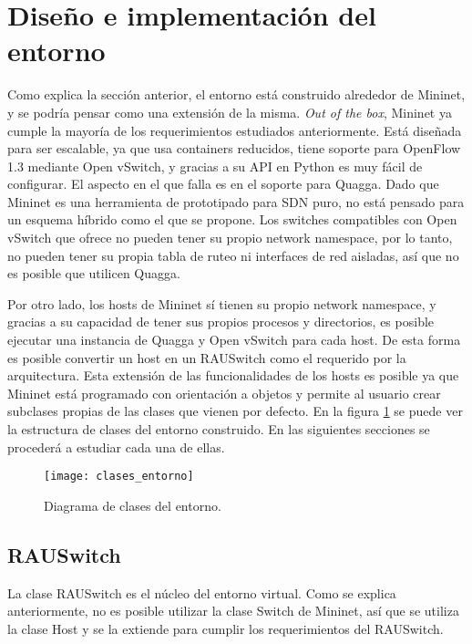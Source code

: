 \section{Diseño e implementación del entorno}
Como explica la sección anterior, el entorno está construido alrededor de Mininet, y se podría pensar como una extensión de la misma. \textit{Out of the box}, Mininet ya cumple la mayoría de los requerimientos estudiados anteriormente. Está diseñada para ser escalable, ya que usa containers reducidos, tiene soporte para OpenFlow 1.3 mediante Open vSwitch, y gracias a su API en Python es muy fácil de configurar. El aspecto en el que falla es en el soporte para Quagga. Dado que Mininet es una herramienta de prototipado para SDN puro, no está pensado para un esquema híbrido como el que se propone. Los switches compatibles con Open vSwitch que ofrece no pueden tener su propio network namespace, por lo tanto, no pueden tener su propia tabla de ruteo ni interfaces de red aisladas, así que no es posible que utilicen Quagga.

Por otro lado, los hosts de Mininet sí tienen su propio network namespace, y gracias a su capacidad de tener sus propios procesos y directorios, es posible ejecutar una instancia de Quagga y Open vSwitch para cada host. De esta forma es posible convertir un host en un RAUSwitch como el requerido por la arquitectura. Esta extensión de las funcionalidades de los hosts es posible ya que Mininet está programado con orientación a objetos y permite al usuario crear subclases propias de las clases que vienen por defecto. En la figura \ref{fig:clases_entorno} se puede ver la estructura de clases del entorno construido. En las siguientes secciones se procederá a estudiar cada una de ellas.

\begin{figure}[t]
	\caption{Diagrama de clases del entorno.}
	\texttt{[image: clases\_entorno]}
	\centering
	\label{fig:clases_entorno}
\end{figure}

\subsection{RAUSwitch}

La clase RAUSwitch es el núcleo del entorno virtual. Como se explica anteriormente, no es posible utilizar la clase Switch de Mininet, así que se utiliza la clase Host y se la extiende para cumplir los requerimientos del RAUSwitch.

